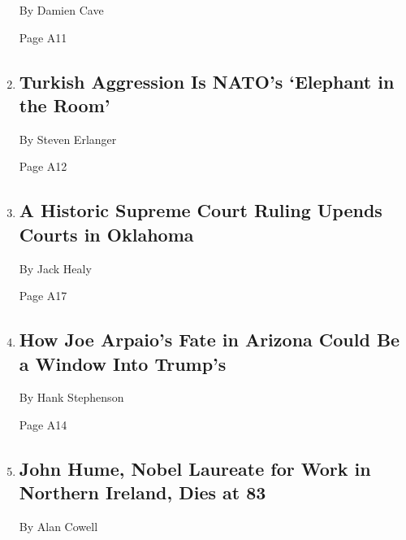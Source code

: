 \begin{enumerate}
  By Damien Cave

  Page A11
\item
  \href{/2020/08/03/world/europe/turkey-nato.html}{}

  \hypertarget{turkish-aggression-is-natos-elephant-in-the-room}{%
  \subsection{Turkish Aggression Is NATO's `Elephant in the
  Room'}\label{turkish-aggression-is-natos-elephant-in-the-room}}

  By Steven Erlanger

  Page A12
\item
  \href{/2020/08/03/us/Supreme-court-Oklahoma-tribal-land-ruling.html}{}

  \hypertarget{a-historic-supreme-court-ruling-upends-courts-in-oklahoma}{%
  \subsection{A Historic Supreme Court Ruling Upends Courts in
  Oklahoma}\label{a-historic-supreme-court-ruling-upends-courts-in-oklahoma}}

  By Jack Healy

  Page A17
\item
  \href{/2020/08/02/us/politics/arizona-election-joe-arpaio.html}{}

  \hypertarget{how-joe-arpaios-fate-in-arizona-could-be-a-window-into-trumps}{%
  \subsection{How Joe Arpaio's Fate in Arizona Could Be a Window Into
  Trump's}\label{how-joe-arpaios-fate-in-arizona-could-be-a-window-into-trumps}}

  By Hank Stephenson

  Page A14
\item
  \href{/2020/08/03/obituaries/john-hume-dies.html}{}

  \hypertarget{john-hume-nobel-laureate-for-work-in-northern-ireland-dies-at-83}{%
  \subsection{John Hume, Nobel Laureate for Work in Northern Ireland,
  Dies at
  83}\label{john-hume-nobel-laureate-for-work-in-northern-ireland-dies-at-83}}

  By Alan Cowell


\end{enumerate}
